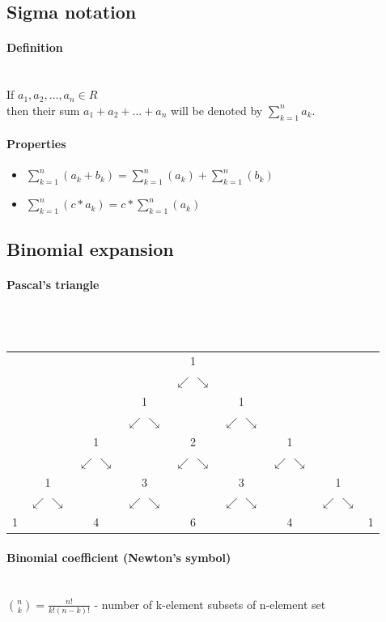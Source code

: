 \documentclass{article}
\begin{document}
\subsection{Sigma notation}
\paragraph{Definition}\mbox{} \\
If $a_1, a_2, \dots, a_n \in R$\\
then their sum $a_1 + a_2 + \dots + a_n$ will be denoted by $\sum^{n}_{k=1}a_k$.
\paragraph{Properties}
\begin{itemize}
    \item $\sum^{n}_{k=1}(a_k + b_k) = \sum^{n}_{k=1}(a_k) + \sum^{n}_{k=1}(b_k)$
    \item $\sum^{n}_{k=1}(c*a_k) =  c*\sum^{n}_{k=1}(a_k)$
\end{itemize}

\subsection{Binomial expansion}
\paragraph{Pascal's triangle}\mbox{}\\\\
\newcommand{\ap}{\ensuremath{\swarrow\,\searrow}}
\setlength{\tabcolsep}{0pt}
\begin{tabular}{ccccccccc}
  &     &     &      & 1   &      &      &     & \\
  &     &     &      & \ap &      &      &     & \\
  &     &     & 1    &     &  1   &      &     & \\
  &     &     & \ap  &     &  \ap &      &     & \\
  &     & 1   &      & 2   &      & 1    &     & \\
  &     & \ap &      & \ap &      & \ap  &     & \\
  & 1   &     & 3    &     &  3   &      & 1   & \\
  &\ap  &     & \ap  &     &  \ap &      & \ap & \\
1 &     & 4   &      & 6   &      & 4    &     & 1
\end{tabular}
\paragraph{Binomial coefficient (Newton's symbol)}\mbox{}\\
${n \choose k} = \frac{n!}{k!(n-k)!}$ - number of k-element subsets of n-element set\\
\end{document}

